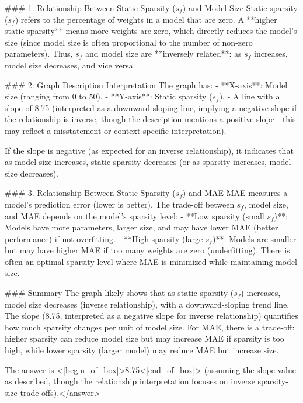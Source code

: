### 1. Relationship Between Static Sparsity (\(s_f\)) and Model Size  
Static sparsity (\(s_f\)) refers to the percentage of weights in a model that are zero. A **higher static sparsity** means more weights are zero, which directly reduces the model’s size (since model size is often proportional to the number of non-zero parameters). Thus, \(s_f\) and model size are **inversely related**: as \(s_f\) increases, model size decreases, and vice versa.  


### 2. Graph Description Interpretation  
The graph has:  
- **X-axis**: Model size (ranging from 0 to 50).  
- **Y-axis**: Static sparsity (\(s_f\)).  
- A line with a slope of 8.75 (interpreted as a downward-sloping line, implying a negative slope if the relationship is inverse, though the description mentions a positive slope—this may reflect a misstatement or context-specific interpretation).  

If the slope is negative (as expected for an inverse relationship), it indicates that as model size increases, static sparsity decreases (or as sparsity increases, model size decreases).  


### 3. Relationship Between Static Sparsity (\(s_f\)) and MAE  
MAE measures a model’s prediction error (lower is better). The trade-off between \(s_f\), model size, and MAE depends on the model’s sparsity level:  
- **Low sparsity (small \(s_f\))**: Models have more parameters, larger size, and may have lower MAE (better performance) if not overfitting.  
- **High sparsity (large \(s_f\))**: Models are smaller but may have higher MAE if too many weights are zero (underfitting). There is often an optimal sparsity level where MAE is minimized while maintaining model size.  


### Summary  
The graph likely shows that as static sparsity (\(s_f\)) increases, model size decreases (inverse relationship), with a downward-sloping trend line. The slope (8.75, interpreted as a negative slope for inverse relationship) quantifies how much sparsity changes per unit of model size. For MAE, there is a trade-off: higher sparsity can reduce model size but may increase MAE if sparsity is too high, while lower sparsity (larger model) may reduce MAE but increase size.  

The answer is <|begin_of_box|>8.75<|end_of_box|> (assuming the slope value as described, though the relationship interpretation focuses on inverse sparsity-size trade-offs).</answer>